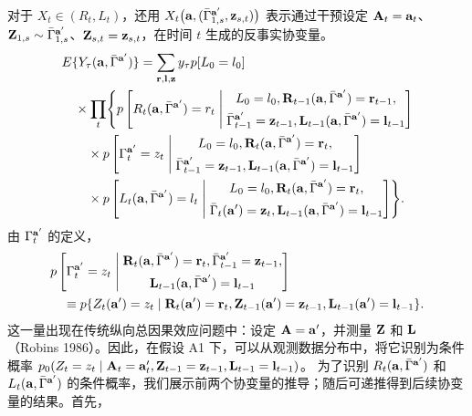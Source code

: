 对于 $X_t\in(R_t,L_t)$，还用
$X_t\bigl(\mathbf a,(\bar\Gamma_{1,s}^{\mathbf a'},\mathbf z_{s,t})\bigr)$
表示通过干预设定 $\mathbf A_t=\mathbf a_t$、$\mathbf Z_{1,s}\sim\bar\Gamma_{1,s}^{\mathbf a'}$、$\mathbf Z_{s,t}=\mathbf z_{s,t}$，在时间 $t$ 生成的反事实协变量。
\begingroup\small
\[
\begin{aligned}
&E\{Y_\tau(\mathbf a,\bar\Gamma^{\mathbf a'})\}
 =\sum_{\mathbf r,\mathbf l,\mathbf z}y_\tau p[L_0=l_0]\\
&\quad\times\prod_t\Biggl\{
 p\left[R_t(\mathbf a,\bar\Gamma^{\mathbf a'})=r_t\;\middle|\;
 \begin{gathered}L_0=l_0,\mathbf R_{t-1}(\mathbf a,\bar\Gamma^{\mathbf a'})=\mathbf r_{t-1},\\
 \bar\Gamma_{t-1}^{\mathbf a'}=\mathbf z_{t-1},
 \mathbf L_{t-1}(\mathbf a,\bar\Gamma^{\mathbf a'})=\mathbf l_{t-1}\end{gathered}\right]\\
&\qquad\times p\left[\Gamma_t^{\mathbf a'}=z_t\;\middle|\;
 \begin{gathered}L_0=l_0,\mathbf R_t(\mathbf a,\bar\Gamma^{\mathbf a'})=\mathbf r_t,\\
 \bar\Gamma_{t-1}^{\mathbf a'}=\mathbf z_{t-1},
 \mathbf L_{t-1}(\mathbf a,\bar\Gamma^{\mathbf a'})=\mathbf l_{t-1}\end{gathered}\right]\\
&\qquad\times p\left[L_t(\mathbf a,\bar\Gamma^{\mathbf a'})=l_t\;\middle|\;
 \begin{gathered}L_0=l_0,\mathbf R_t(\mathbf a,\bar\Gamma^{\mathbf a'})=\mathbf r_t,\\
 \bar\Gamma_t(\mathbf a')=\mathbf z_t,
 \mathbf L_{t-1}(\mathbf a,\bar\Gamma^{\mathbf a'})=\mathbf l_{t-1}\end{gathered}\right]
 \Biggr\}.
\end{aligned}
\]
\endgroup
由 $\Gamma_t^{\mathbf a'}$ 的定义，
\[
\begin{aligned}
&p\left[\Gamma_t^{\mathbf a'}=z_t\;\middle|\;
 \begin{gathered}\mathbf R_t(\mathbf a,\bar\Gamma^{\mathbf a'})=\mathbf r_t,
 \bar\Gamma_{t-1}^{\mathbf a'}=\mathbf z_{t-1},\\
 \mathbf L_{t-1}(\mathbf a,\bar\Gamma^{\mathbf a'})=\mathbf l_{t-1}\end{gathered}\right]\\
&\quad\equiv p\{Z_t(\mathbf a')=z_t\mid
 \mathbf R_t(\mathbf a')=\mathbf r_t,
 \mathbf Z_{t-1}(\mathbf a')=\mathbf z_{t-1},
 \mathbf L_{t-1}(\mathbf a')=\mathbf l_{t-1}\}.
\end{aligned}
\]
这一量出现在传统纵向总因果效应问题中：设定 $\mathbf A=\mathbf a'$，并测量 $\mathbf Z$ 和 $\mathbf L$（Robins 1986）。因此，在假设 A1 下，可以从观测数据分布中，将它识别为条件概率
$p_0(Z_t=z_t\mid\mathbf A_t=\mathbf a_t',\mathbf Z_{t-1}=\mathbf z_{t-1},\mathbf L_{t-1}=\mathbf l_{t-1})$。
为了识别 $R_t(\mathbf a,\bar\Gamma^{\mathbf a'})$ 和 $L_t(\mathbf a,\bar\Gamma^{\mathbf a'})$ 的条件概率，我们展示前两个协变量的推导；随后可递推得到后续协变量的结果。首先，
